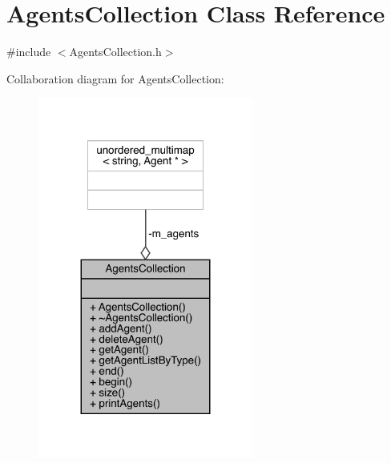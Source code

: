 \hypertarget{class_agents_collection}{}\section{Agents\+Collection Class Reference}
\label{class_agents_collection}


{\ttfamily \#include $<$Agents\+Collection.\+h$>$}



Collaboration diagram for Agents\+Collection\+:
\nopagebreak
\begin{figure}[H]
\begin{center}
\leavevmode
\includegraphics[width=200pt]{class_agents_collection__coll__graph}
\end{center}
\end{figure}
